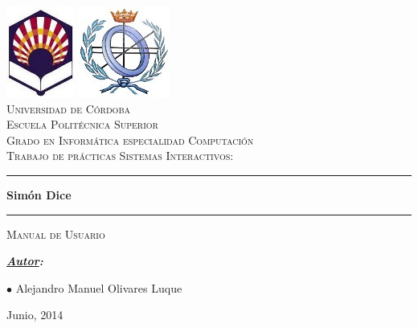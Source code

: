 \begin{titlepage}

	\begin{center}
	
		\includegraphics{imagenes/logo_proyecto_uco.jpg}
		\includegraphics{imagenes/escudo_informatica.jpg} \\[0.5cm]

		\textsc{\Large Universidad de Córdoba}\\[3mm]
		\textsc{\Large Escuela Politécnica Superior}\\[3mm]
		\textsc{\Large Grado en Informática especialidad Computación}\\[2cm]
		
		\textsc{\Large Trabajo de prácticas Sistemas Interactivos:}\\[0.5cm]
		
		\begin{onehalfspace}
			\hrule \vspace{0.5cm}
			\large \bfseries Simón Dice\vspace{0.5cm}
			\hrule \vspace{0.5cm}
		\end{onehalfspace}
		
		\textsc{\Large Manual de Usuario}\\[2.5cm]
	
	\end{center}
		
	\begin{minipage}{0.5 \textwidth}
		\begin{flushleft}
			\emph{\bfseries \underline{Autor}:\\}%

			$\bullet$ Alejandro Manuel Olivares Luque%
			
		\end{flushleft}
	\end{minipage}%
	\begin{minipage}{0.5\textwidth}

	\end{minipage}		
		
	\vfill

	\begin{center}
	
		{\large Junio, 2014}
	
	\end{center}
	
\end{titlepage} 
